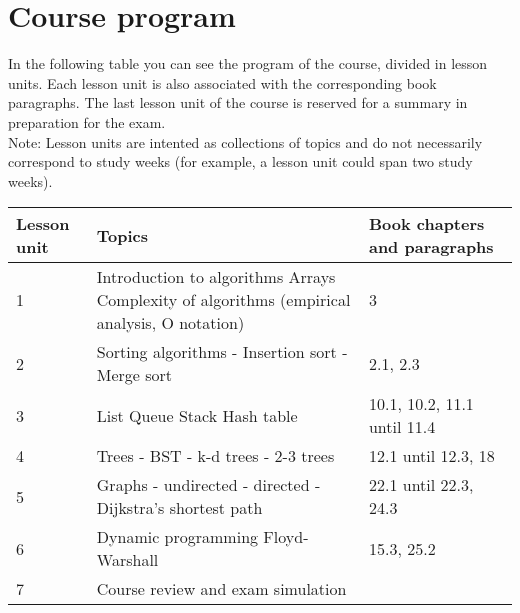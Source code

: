 \section{Course program}
	
	In the following table you can see the program of the course, divided in lesson units. Each lesson unit is also associated with the corresponding book paragraphs. The last lesson unit of the course is reserved for a summary in preparation for the exam. \\
	Note: Lesson units are intented as collections of topics and do not necessarily correspond to study weeks (for example, a lesson unit could span two study weeks). \\
	
	\begin{tabular}{ | p{1.2cm} | p{10cm} | p{2.7cm} | }
		\hline
	  	\textbf{Lesson unit} & \textbf{Topics} & \textbf{Book chapters and paragraphs} \\
	  	\hline
  		1 & Introduction to algorithms \newline Arrays \newline Complexity of algorithms (empirical analysis, O notation) & 3 \\
  		\hline
  		2 & Sorting algorithms \newline - Insertion sort \newline - Merge sort & 2.1, 2.3 \\
  		\hline
  		3 & List \newline Queue \newline Stack \newline Hash table &  10.1, 10.2, 11.1 until 11.4 \\
  		\hline
  		4 & Trees \newline - BST \newline - k-d trees \newline - 2-3 trees & 12.1 until 12.3, 18 \\
  		\hline
  		5 & Graphs \newline - undirected \newline - directed \newline - Dijkstra's shortest path & 22.1 until 22.3, 24.3 \\
  		\hline
  		6 & Dynamic programming \newline Floyd-Warshall & 15.3, 25.2\\
  		\hline
  		7 & Course review and exam simulation & \\
  		\hline
	\end{tabular}
\begin{comment}
  		4 & Binary search trees & 3.2 \\
  		\hline
  		5 & Balanced search trees: 2-3 search trees & 3.3 \\
  		\hline
  		6 & Graphs (undirected; directed; Dijkstra shortest path) & 4.1, 4.2, 4.4 \\
  		\hline
  		7 & Dynamic programming; Floyd-Warshall & Not covered by the book, see slides or Cormen\\
  		\hline
  		8 & Course recap & \\
  		\hline
\end{comment}
